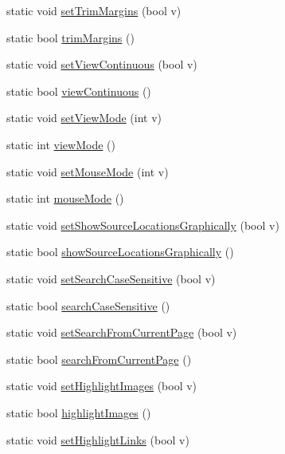 \begin{DoxyCompactItemize}
\item 
static void \hyperlink{classOkular_1_1Settings_a8e8b121ef3073f75e38e0a05baa7aeb0}{set\+Trim\+Margins} (bool v)
\item 
static bool \hyperlink{classOkular_1_1Settings_aaafcee0b6362edd2811f3ca8d575493d}{trim\+Margins} ()
\item 
static void \hyperlink{classOkular_1_1Settings_ad005995d44c853b46a7aa8971a610697}{set\+View\+Continuous} (bool v)
\item 
static bool \hyperlink{classOkular_1_1Settings_a6f16a784dc815b9192ce24d054e3f82b}{view\+Continuous} ()
\item 
static void \hyperlink{classOkular_1_1Settings_a000321ae89149a9e10e9911152781633}{set\+View\+Mode} (int v)
\item 
static int \hyperlink{classOkular_1_1Settings_a54872ccea98a1749bdccc6552c1aaa84}{view\+Mode} ()
\item 
static void \hyperlink{classOkular_1_1Settings_a84a1d9b580ce89af9d2472e9e6b6bc2e}{set\+Mouse\+Mode} (int v)
\item 
static int \hyperlink{classOkular_1_1Settings_af8e39e25e841b413d67af2cb4dfc0688}{mouse\+Mode} ()
\item 
static void \hyperlink{classOkular_1_1Settings_ab9f7350a8d8fa5ed20ca2ba26861d031}{set\+Show\+Source\+Locations\+Graphically} (bool v)
\item 
static bool \hyperlink{classOkular_1_1Settings_a0b10da29207269b4a338dcf9f18d6d7b}{show\+Source\+Locations\+Graphically} ()
\item 
static void \hyperlink{classOkular_1_1Settings_a465efccc716313b6a87a66deb9bea1c1}{set\+Search\+Case\+Sensitive} (bool v)
\item 
static bool \hyperlink{classOkular_1_1Settings_a8d48ce79f6550882a1f534b7d9f585da}{search\+Case\+Sensitive} ()
\item 
static void \hyperlink{classOkular_1_1Settings_a5e068bf9b47cad71698648241c043657}{set\+Search\+From\+Current\+Page} (bool v)
\item 
static bool \hyperlink{classOkular_1_1Settings_ab8c9672dbe258f4910756810c4b3db14}{search\+From\+Current\+Page} ()
\item 
static void \hyperlink{classOkular_1_1Settings_a13892172d6c8fde8b05194cad35b5d77}{set\+Highlight\+Images} (bool v)
\item 
static bool \hyperlink{classOkular_1_1Settings_a41a6c31cc235e4854b19ce95fde54e83}{highlight\+Images} ()
\item 
static void \hyperlink{classOkular_1_1Settings_a18e9aebfb15e7e257310d79800f7b84f}{set\+Highlight\+Links} (bool v)

\end{DoxyCompactItemize}
